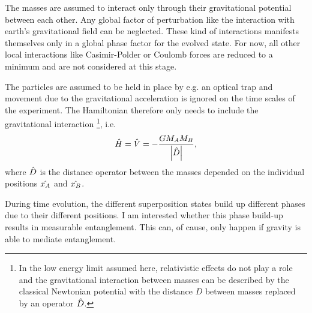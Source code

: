 The masses are assumed to interact only through their gravitational potential between each other. Any global factor of perturbation like the interaction with earth's gravitational field can be neglected. These kind of interactions manifests themselves only in a global phase factor for the evolved state.
For now, all other local interactions like Casimir-Polder \cite{Casimir_1948} or Coulomb forces are reduced to a minimum and are not considered at this stage.

The particles are assumed to be held in place by e.g. an optical trap and movement due to the gravitational acceleration is ignored on the time scales of the experiment. The Hamiltonian therefore only needs to include the gravitational interaction \footnote{In the low energy limit assumed here, relativistic effects do not play a role and the gravitational interaction between masses can be described by the classical Newtonian potential with the distance $D$ between masses replaced by an operator $\hat{D}$.}, i.e.
\begin{equation}\label{eq:2:hamiltonian}
  \hat{H} = \hat{V} = -\frac{G M_A M_B}{\left\lvert\hat{D}\right\rvert},
\end{equation}
where $\hat{D}$ is the distance operator between the masses depended on the individual positions $\hat{x_A}$ and $\hat{x_B}$.

During time evolution, the different superposition states build up different phases due to their different positions. I am interested whether this phase build-up results in measurable entanglement. This can, of cause, only happen if gravity is able to mediate entanglement.

